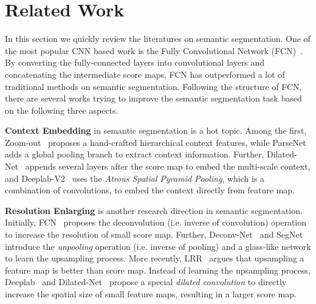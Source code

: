 \documentclass[10pt,twocolumn,letterpaper]{article}
\begin{document}
\section{Related Work}
   In this section we quickly review the literatures on semantic segmentation. One of the most popular CNN based work is the Fully Convolutional Network (FCN)~\cite{long2015fully}. By converting the fully-connected layers into convolutional layers and concatenating the intermediate score maps, FCN has outperformed a lot of traditional methods on semantic segmentation. Following the structure of FCN, there are several works trying to improve the semantic segmentation task based on the following three aspects. 
\par
   \textbf{Context Embedding} in semantic segmentation is a hot topic. Among the first, Zoom-out~\cite{mostajabi2015feedforward} proposes a hand-crafted hierarchical context features, while ParseNet~\cite{liu2015parsenet} adds a global pooling branch to extract context information. Further, Dilated-Net~\cite{yu2015multi} appends several layers after the score map to embed the multi-scale context, and Deeplab-V2~\cite{chen2016deeplab} uses the \emph{Atrous Spatial Pyramid Pooling}, which is a combination of convolutions, to embed the context directly from feature map. 
\par
   \textbf{Resolution Enlarging} is another research direction in semantic segmentation. Initially, FCN~\cite{long2015fully} proposes the deconvolution (i.e. inverse of convolution) operation to increase the resolution of small score map. Further, Deconv-Net~\cite{noh2015learning} and SegNet~\cite{badrinarayanan2015segnet} introduce the \emph{unpooling} operation (i.e. inverse of pooling) and a glass-like network to learn the upsampling process. More recently, LRR~\cite{ghiasi2016laplacian} argues that upsampling a feature map is better than score map. Instead of learning the upsampling process, Deeplab~\cite{liu2015semantic} and Dilated-Net~\cite{yu2015multi} propose a special \emph{dilated convolution} to directly increase the spatial size of small feature maps, resulting in a larger score map.
\par
\end{document}
